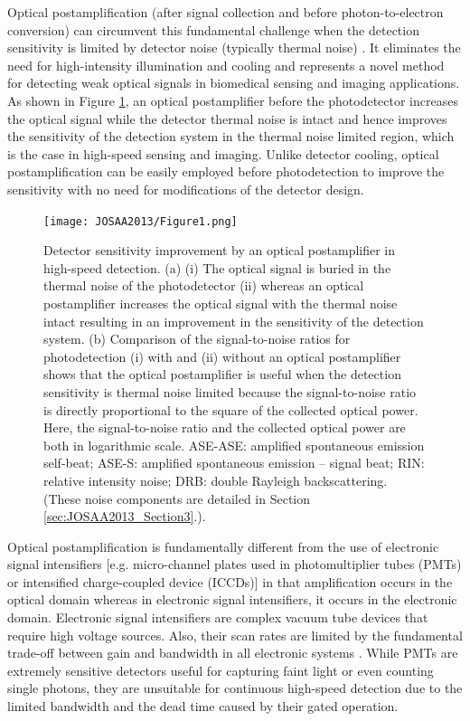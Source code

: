 Optical postamplification (after signal collection and before photon-to-electron conversion) can circumvent this fundamental challenge when the detection sensitivity is limited by detector noise (typically thermal noise) \cite{goda2009serial,goda2008amplified,mahjoubfar2011,goda2009theory,tsia2010performance,qian2009real,han2003photonic,goda2013dispersive}. It eliminates the need for high-intensity illumination and cooling and represents a novel method for detecting weak optical signals in biomedical sensing and imaging applications. As shown in Figure \ref{fig:JOSAA2013_Figure1}, an optical postamplifier before the photodetector increases the optical signal while the detector thermal noise is intact and hence improves the sensitivity of the detection system in the thermal noise limited region, which is the case in high-speed sensing and imaging. Unlike detector cooling, optical postamplification can be easily employed before photodetection to improve the sensitivity with no need for modifications of the detector design. 

\begin{figure}[htb!]
\centering
\texttt{[image: JOSAA2013/Figure1.png]}
\caption{Detector sensitivity improvement by an optical postamplifier in high-speed detection. (a) (i) The optical signal is buried in the thermal noise of the photodetector (ii) whereas an optical postamplifier increases the optical signal with the thermal noise intact resulting in an improvement in the sensitivity of the detection system. (b) Comparison of the signal-to-noise ratios for photodetection (i) with and (ii) without an optical postamplifier shows that the optical postamplifier is useful when the detection sensitivity is thermal noise limited because the signal-to-noise ratio is directly proportional to the square of the collected optical power. Here, the signal-to-noise ratio and the collected optical power are both in logarithmic scale. ASE-ASE: amplified spontaneous emission self-beat; ASE-S: amplified spontaneous emission – signal beat; RIN: relative intensity noise; DRB: double Rayleigh backscattering. (These noise components are detailed in Section \ref{sec:JOSAA2013_Section3}.).}
\label{fig:JOSAA2013_Figure1}
\end{figure}

Optical postamplification is fundamentally different from the use of electronic signal intensifiers [e.g. micro-channel plates used in photomultiplier tubes (PMTs) or intensified charge-coupled device (ICCDs)] in that amplification occurs in the optical domain whereas in electronic signal intensifiers, it occurs in the electronic domain. Electronic signal intensifiers are complex vacuum tube devices that require high voltage sources. Also, their scan rates are limited by the fundamental trade-off between gain and bandwidth in all electronic systems \cite{horowitz1989art}. While PMTs are extremely sensitive detectors useful for capturing faint light or even counting single photons, they are unsuitable for continuous high-speed detection due to the limited bandwidth and the dead time caused by their gated operation.

